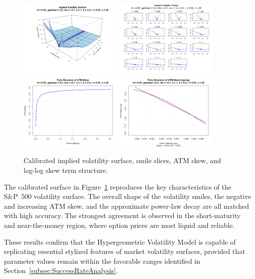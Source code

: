 \begin{figure}[H]
    \centering
    \includegraphics[width=0.45\textwidth]{figures/6.2 Best Fit Surface/best_fit1_iv_surface.png}
    \includegraphics[width=0.45\textwidth]{figures/6.2 Best Fit Surface/best_fit1_iv_smiles.png}
    \includegraphics[width=0.45\textwidth]{figures/6.2 Best Fit Surface/best_fit1_atm_skew.png}
    \includegraphics[width=0.45\textwidth]{figures/6.2 Best Fit Surface/best_fit1_atm_skew_log.png}
    \caption{Calibrated implied volatility surface, smile slices, ATM skew, and log-log skew term structure.}
    \label{fig:BestFitSurface}
\end{figure}

The calibrated surface in Figure~\ref{fig:BestFitSurface} reproduces the key characteristics of the S\&P~500 volatility surface. The overall shape of the volatility smiles, the negative and increasing ATM skew, and the approximate power-law decay are all matched with high accuracy. The strongest agreement is observed in the short-maturity and near-the-money region, where option prices are most liquid and reliable.

These results confirm that the Hypergeometric Volatility Model is capable of replicating essential stylized features of market volatility surfaces, provided that parameter values remain within the favorable ranges identified in Section~\ref{subsec:SuccessRateAnalysis}.